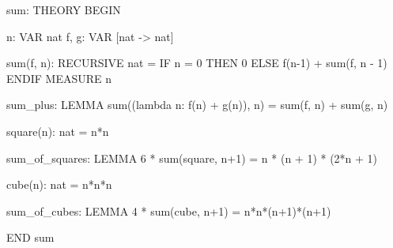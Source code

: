 sum: THEORY
BEGIN

  n: VAR nat
  f, g: VAR [nat -> nat]

  sum(f, n): RECURSIVE nat =
    IF n = 0
       THEN 0
       ELSE f(n-1) + sum(f, n - 1)
    ENDIF
   MEASURE n

  sum_plus: LEMMA
   sum((lambda n: f(n) + g(n)), n) = sum(f, n) + sum(g, n)

  square(n): nat = n*n

  sum_of_squares: LEMMA
    6 * sum(square, n+1) = n * (n + 1) * (2*n + 1)

  cube(n): nat = n*n*n 

  sum_of_cubes: LEMMA
    4 * sum(cube, n+1) = n*n*(n+1)*(n+1)

END sum
